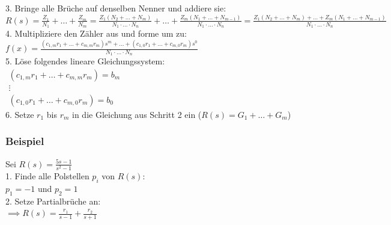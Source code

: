 \documentclass[10pt,a4paper]{article}
\begin{document}
3. Bringe alle Brüche auf denselben Nenner und addiere sie: \\
$R(s) = \frac{Z_1}{N_1} + \dots + \frac{Z_m}{N_m} = \frac{Z_1(N_2 + \dots + N_m)}{N_1 ⋅ \dots ⋅ N_n} + \dots + \frac{Z_m(N_1 + \dots + N_{m-1})}{N_1 ⋅ \dots ⋅ N_n} = \frac{Z_1(N_2 + \dots + N_m) + \dots + Z_m(N_1 + \dots + N_{m-1})}{N_1 ⋅ \dots ⋅ N_n}$ \\

4. Multipliziere den Zähler aus und forme um zu: \\
$ f(x) = \frac{(c_{1,m}r_1 + \dots + c_{m,m}r_m)s^m + \dots + (c_{1,0}r_1 + \dots + c_{m,0}r_m)s^0}{N_1 ⋅ \dots ⋅ N_n}$ \\

5. Löse folgendes lineare Gleichungssystem: \\
$\begin{array}{c}
(c_{1,m}r_1 + \dots + c_{m,m}r_m) = b_m \\
\vdots \\
(c_{1,0}r_1 + \dots + c_{m,0}r_m) = b_0
\end{array}$ \\

6. Setze $r_1$ bis $r_m$ in die Gleichung aus Schritt 2 ein ($R(s) = G_1 + \dots + G_m$)

%
%

\subsubsection{Beispiel}
Sei $R(s) = \frac{5s-1}{s^2-1}$ \\

1. Finde alle Polstellen $p_i$ von $R(s):$ \\
$p_1 = -1$ und $p_2 = 1$ \\

2. Setze Partialbrüche an: \\
$\implies R(s) = \frac {r_1} {s - 1} + \frac {r_2} {s + 1}$ \\
\end{document}

